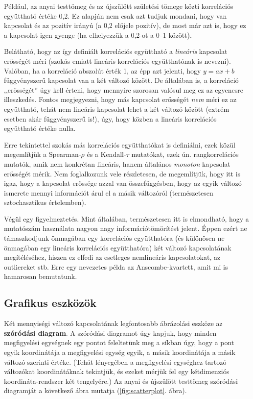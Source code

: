 \documentclass[]{book}
\begin{document}
Például, az anyai testtömeg és az újszülött születési tömege közti
korrelációs együttható értéke 0,2. Ez alapján nem csak azt tudjuk
mondani, hogy van kapcsolat és az pozitív irányú (a 0,2 előjele
pozitív), de most már azt is, hogy ez a kapcsolat igen gyenge (ha
elhelyezzük a 0,2-ot a 0--1 között).

Belátható, hogy az így definiált korrelációs együttható a
\emph{lineáris} kapcsolat erősségét méri (szokás emiatt lineáris
korrelációs együtthatónak is nevezni). Valóban, ha a korreláció abszolút
érték 1, az épp azt jelenti, hogy \(y=ax+b\) függvényszerű kapcsolat van
a két változó között. De általában is, a korreláció ,,erősségét'' úgy
kell érteni, hogy mennyire szorosan valósul meg ez az egyenesre
illeszkedés. Fontos megjegyezni, hogy más kapcsolat erősségét \emph{nem}
méri ez az együttható, tehát nem lineáris kapcsolat lehet a két változó
között (extrém esetben akár függvényszerű is!), úgy, hogy közben a
lineáris korrelációs együttható értéke nulla.

Erre tekintettel szokás más korrelációs együtthatókat is definiálni,
ezek közül megemlítjük a Spearman-\(\rho\) és a Kendall-\(\tau\)
mutatókat, ezek ún. rangkorrelációs mutatók, amik nem konkrétan
lineáris, hanem általános \emph{monoton} kapcsolat erősségét mérik. Nem
foglalkozunk vele részletesen, de megemlítjük, hogy itt is igaz, hogy a
kapcsolat erőssége azzal van összefüggésben, hogy az egyik változó
ismerete mennyi információt árul el a másik változóról (természetesen
sztochasztikus értelemben).

Végül egy figyelmeztetés. Mint általában, természetesen itt is
elmondható, hogy a mutatószám használata nagyon nagy
információtömörítést jelent. Éppen ezért ne támaszkodjunk önmagában egy
korrelációs együtthatóra (és különösen ne önmagában egy lineáris
korrelációs együtthatóra) két változó kapcsolatának megítéléséhez,
hiszen ez elfedi az esetleges nemlineáris kapcsolatokat, az outliereket
stb. Erre egy nevezetes példa az Anscombe-kvartett, amit mi is hamarosan
bemutatunk.

\subsection{Grafikus eszközök}\label{deskriptivmennyketvaltvaltgrafikus}

Két mennyiségi változó kapcsolatának legfontosabb ábrázolási eszköze az
\textbf{szóródási diagram}. A szóródási diagramot úgy kapjuk, hogy
minden megfigyelési egységnek egy pontot feleltetünk meg a síkban úgy,
hogy a pont egyik koordinátája a megfigyelési egység egyik, a másik
koordinátája a másik változó szerinti értéke. (Tehát lényegében a
megfigyelési egységhez tartozó változókat koordinátáknak tekintjük, és
ezeket mérjük fel egy kétdimenziós koordináta-rendszer két tengelyére.)
Az anyai és újszülött testtömeg szóródási diagramját a következő ábra
mutatja (\ref{fig:scatterplot}. ábra).
\end{document}
